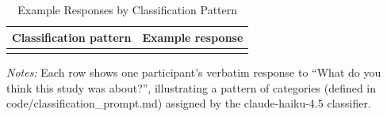 \documentclass[11pt]{article}
\begin{document}
\begin{table}[H]
\caption{Example Responses by Classification Pattern}
\label{tab:debrief_examples}
\centering
\begin{tabularx}{\textwidth}{>{\raggedright\arraybackslash}p{} >{\raggedright\arraybackslash}X}
\toprule
Classification pattern & Example response \\
\midrule

\\
\bottomrule
\end{tabularx}
\begin{minipage}{\textwidth}
\vspace{0.5em}
\footnotesize
\textit{Notes:} Each row shows one participant's verbatim response to ``What do you think this study was about?'', illustrating a pattern of categories (defined in code/classification\_prompt.md) assigned by the claude-haiku-4.5 classifier.
\end{minipage}
\end{table}
\end{document}
